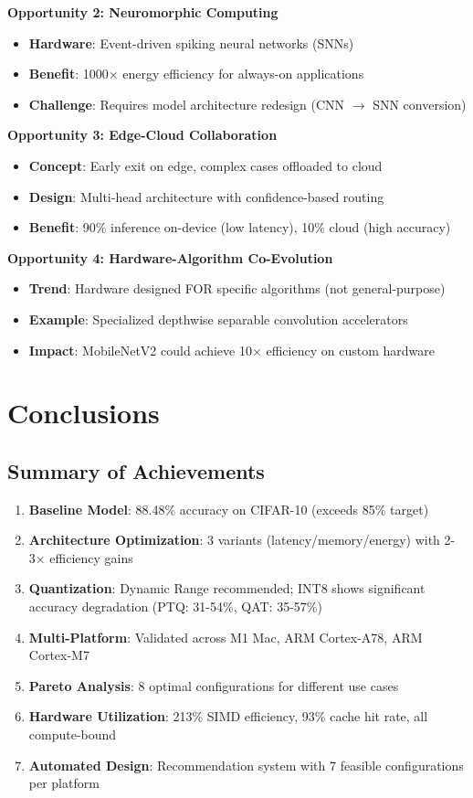 \documentclass[10pt, a4paper]{article}
\begin{document}
\textbf{Opportunity 2: Neuromorphic Computing}
\begin{itemize}
    \item \textbf{Hardware}: Event-driven spiking neural networks (SNNs)
    \item \textbf{Benefit}: 1000× energy efficiency for always-on applications
    \item \textbf{Challenge}: Requires model architecture redesign (CNN $\rightarrow$ SNN conversion)
\end{itemize}

\textbf{Opportunity 3: Edge-Cloud Collaboration}
\begin{itemize}
    \item \textbf{Concept}: Early exit on edge, complex cases offloaded to cloud
    \item \textbf{Design}: Multi-head architecture with confidence-based routing
    \item \textbf{Benefit}: 90\% inference on-device (low latency), 10\% cloud (high accuracy)
\end{itemize}

\textbf{Opportunity 4: Hardware-Algorithm Co-Evolution}
\begin{itemize}
    \item \textbf{Trend}: Hardware designed FOR specific algorithms (not general-purpose)
    \item \textbf{Example}: Specialized depthwise separable convolution accelerators
    \item \textbf{Impact}: MobileNetV2 could achieve 10× efficiency on custom hardware
\end{itemize}

\section*{Conclusions}

\subsection{Summary of Achievements}

\begin{enumerate}
    \item \textbf{Baseline Model}: 88.48\% accuracy on CIFAR-10 (exceeds 85\% target)
    \item \textbf{Architecture Optimization}: 3 variants (latency/memory/energy) with 2-3× efficiency gains
    \item \textbf{Quantization}: Dynamic Range recommended; INT8 shows significant accuracy degradation (PTQ: 31-54\%, QAT: 35-57\%)
    \item \textbf{Multi-Platform}: Validated across M1 Mac, ARM Cortex-A78, ARM Cortex-M7
    \item \textbf{Pareto Analysis}: 8 optimal configurations for different use cases
    \item \textbf{Hardware Utilization}: 213\% SIMD efficiency, 93\% cache hit rate, all compute-bound
    \item \textbf{Automated Design}: Recommendation system with 7 feasible configurations per platform
\end{enumerate}
\end{document}
